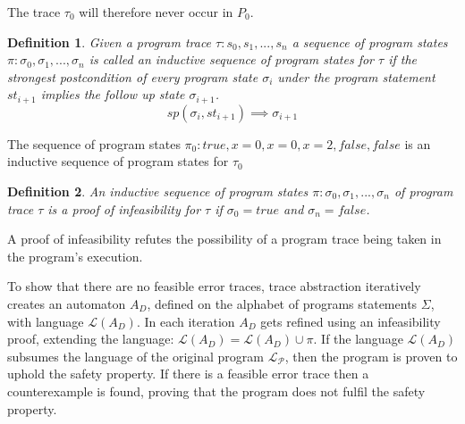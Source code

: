 \documentclass{article}
\newcounter{example}[section]
\newtheorem{mydef}{Definition}
\newcommand\mycom[1]{}
\newcommand\mycom[1]{#1}
\newcommand{\dd}[1]{\mycom{\todo[color=orange!40,inline]{\small DD: #1}}}
\begin{document}
The trace $\tau_0$ will therefore never occur in $P_0$. 
\dd{See, this is not correct. The trace is in $P_0$, but there is no corresponding execution.}

\dd{No! 
This is wrong. 
First, you do not want to talk about program states here. 
You want to talk about predicates, interpolants, state assertions! 
The strongest post of a program state and a statement \textit{is} just \textit{the} successor state in a fixed execution. 
Second, a trace has many (potentially infinite) executions. So ``every program state'' may refer to all possible executions of $\tau$, making inductiveness a property dependent on $\tau$ as well.  
}
\begin{mydef}
    Given a program trace $\tau: s_0, s_1, ..., s_n$ a sequence of program states $\pi: \sigma_0, \sigma_1, ..., \sigma_n$ is called an inductive sequence of program states for $\tau$ if the strongest postcondition of every program state $\sigma_i$ under the program statement $st_{i+1}$ implies the follow up state $\sigma_{i+1}$. 
    \begin{equation*}
            sp(\sigma_i, st_{i+1}) \implies \sigma_{i+1}
    \end{equation*}
\end{mydef}
\dd{$true$ is not a program state!}
The sequence of program states $\pi_0: true, x = 0, x = 0, x = 2, false, false$ is an inductive sequence of program states for $\tau_0$

\begin{mydef}
    An inductive sequence  of program states $\pi: \sigma_0, \sigma_1,..., \sigma_n$ of program trace $\tau$ is a proof of infeasibility for $\tau$ if $\sigma_0 = true$ and $\sigma_n = false$.
\end{mydef}
A proof of infeasibility refutes the possibility of a program trace being taken in the program's execution.

To show that there are no feasible error traces, trace abstraction iteratively creates an automaton $A_D$, defined on the alphabet of programs statements $\Sigma$, with language $\mathcal{L}(A_D)$. 
In each iteration $A_D$ gets refined using an infeasibility proof, extending the language: $\mathcal{L}(A_D) = \mathcal{L}(A_D) \cup \pi$.
If the language $\mathcal{L}(A_D)$ subsumes the language of the original program $\mathcal{L_P}$, then the program is proven to uphold the safety property.
If there is a feasible error trace then a counterexample is found, proving that the program does not fulfil the safety property.
\end{document}
